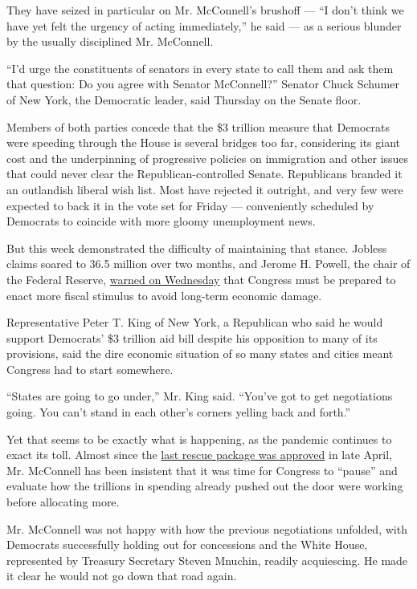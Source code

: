 They have seized in particular on Mr. McConnell's brushoff --- ``I don't
think we have yet felt the urgency of acting immediately,'' he said ---
as a serious blunder by the usually disciplined Mr. McConnell.

``I'd urge the constituents of senators in every state to call them and
ask them that question: Do you agree with Senator McConnell?'' Senator
Chuck Schumer of New York, the Democratic leader, said Thursday on the
Senate floor.

Members of both parties concede that the \$3 trillion measure that
Democrats were speeding through the House is several bridges too far,
considering its giant cost and the underpinning of progressive policies
on immigration and other issues that could never clear the
Republican-controlled Senate. Republicans branded it an outlandish
liberal wish list. Most have rejected it outright, and very few were
expected to back it in the vote set for Friday --- conveniently
scheduled by Democrats to coincide with more gloomy unemployment news.

But this week demonstrated the difficulty of maintaining that stance.
Jobless claims soared to 36.5 million over two months, and Jerome H.
Powell, the chair of the Federal Reserve,
\href{https://www.nytimes.com/2020/05/13/business/economy/fed-chair-powell-economy-virus-support.html}{warned
on Wednesday} that Congress must be prepared to enact more fiscal
stimulus to avoid long-term economic damage.

Representative Peter T. King of New York, a Republican who said he would
support Democrats' \$3 trillion aid bill despite his opposition to many
of its provisions, said the dire economic situation of so many states
and cities meant Congress had to start somewhere.

``States are going to go under,'' Mr. King said. ``You've got to get
negotiations going. You can't stand in each other's corners yelling back
and forth.''

Yet that seems to be exactly what is happening, as the pandemic
continues to exact its toll. Almost since the
\href{https://www.nytimes.com/2020/04/21/us/politics/congress-business-relief-ppp.html}{last
rescue package was approved} in late April, Mr. McConnell has been
insistent that it was time for Congress to ``pause'' and evaluate how
the trillions in spending already pushed out the door were working
before allocating more.

Mr. McConnell was not happy with how the previous negotiations unfolded,
with Democrats successfully holding out for concessions and the White
House, represented by Treasury Secretary Steven Mnuchin, readily
acquiescing. He made it clear he would not go down that road again.

